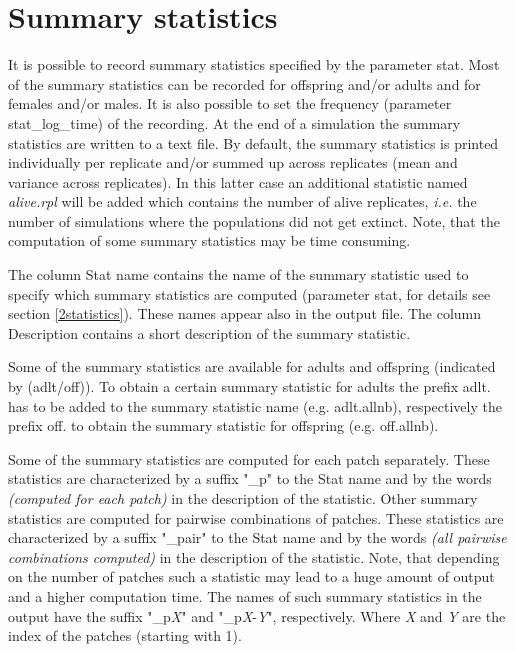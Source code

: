 \documentclass[letterpaper,12pt,oneside]{book}
\begin{document}
\section{Summary statistics}\label{sec:Statistics}
It is possible to record summary statistics specified by the parameter \textsf{stat}. Most of the summary statistics can be recorded for offspring and/or adults and for females and/or males. It is also possible to set the frequency (parameter \textsf{stat\_log\_time}) of the recording. At the end of a simulation the summary statistics are written to a text file. By default, the summary statistics is printed  individually per replicate and/or summed up across replicates (mean and variance across replicates). In this latter case an additional statistic named \textit{alive.rpl} will be added which contains the number of alive replicates, \textit{i.e.} the number of simulations where the populations did not get extinct. Note, that the computation of some summary statistics may be time consuming. 

The column \textsf{Stat name} contains the name of the summary statistic used to specify which summary statistics are computed (parameter \textsf{stat}, for details see section \ref{2statistics}). These names appear also in the output file. The column \textsf{Description} contains a short description of the summary statistic. 

Some of the summary statistics are available for adults and offspring (indicated by \textsf{(adlt/off)}). To obtain a certain summary statistic for adults the prefix \textsf{adlt.} has to be added to the summary statistic name (e.g. \textsf{adlt.allnb}), respectively the prefix \textsf{off.} to obtain the summary statistic for offspring (e.g. \textsf{off.allnb}). 

Some of the summary statistics are computed for each patch separately. These statistics are characterized by a suffix "\_p" to the \textsf{Stat name} and by the words \textit{(computed for each patch)} in the description of the statistic. Other summary statistics are computed for pairwise combinations of patches. These statistics are characterized by a suffix "\_pair" to the \textsf{Stat name} and by the words \textit{(all pairwise combinations computed)} in the description of the statistic. Note, that depending on the number of patches such a statistic may lead to a huge amount of output and a higher computation time. The names of such summary statistics in the output have the suffix "\_p\textit{X}" and "\_p\textit{X}-\textit{Y}", respectively. Where \textit{X} and \textit{Y} are the index of the patches (starting with 1). 
\end{document}
